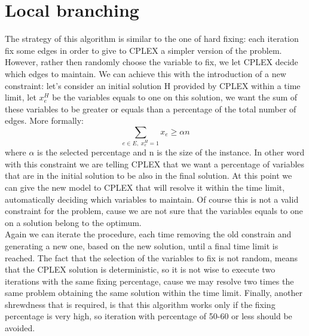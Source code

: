 \section{Local branching}
The strategy of this algorithm is similar to the one of hard fixing: each iteration fix some edges in order to give to CPLEX a simpler version of the problem. However, rather then randomly choose the variable to fix, we let CPLEX decide which edges to maintain. We can achieve this with the introduction of a new constraint: let's consider an initial solution H provided by CPLEX within a time limit, let $x_e^H$ be the variables equals to one on this solution, we want the sum of these variables to be greater or equals than a percentage of the total number of edges. More formally:
\begin{equation*}
	\sum_{e \in E, \; x_e^H = 1} x_e \geq \alpha n
\end{equation*}
where $\alpha$ is the selected percentage and n is the size of the instance. In other word with this constraint we are telling CPLEX that we want a percentage of variables that are in the initial solution to be also in the final solution. At this point we can give the new model to CPLEX that will resolve it within the time limit, automatically deciding which variables to maintain.
Of course this is not a valid constraint for the problem, cause we are not sure that the variables equals to one on a solution belong to the optimum.\\
Again we can iterate the procedure, each time removing the old constrain and generating a new one, based on the new solution, until a final time limit is reached. The fact that the selection of the variables to fix is not random, means that the CPLEX solution is deterministic, so it is not wise to execute two iterations with the same fixing percentage, cause we may resolve two times the same problem obtaining the same solution within the time limit.
Finally, another shrewdness that is required, is that this algorithm works only if the fixing percentage is very high, so iteration with percentage of 50-60 or less should be avoided.
